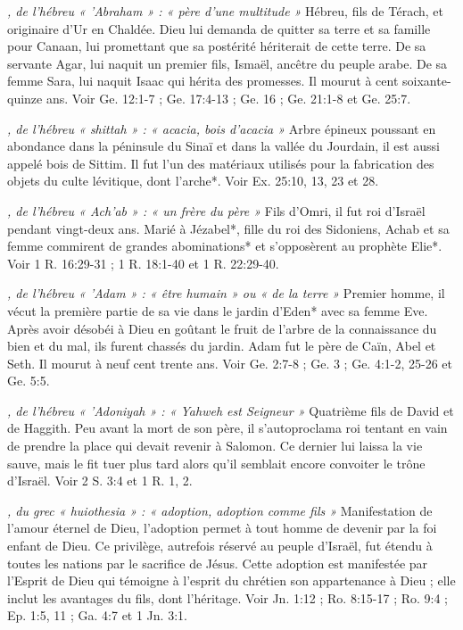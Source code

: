 \begin{multicols}{2}
{\textit{, de l'hébreu « 'Abraham » : « père d'une multitude »}\newline
Hébreu, fils de Térach, et originaire d'Ur en Chaldée. Dieu lui demanda de quitter sa terre et sa famille pour Canaan, lui promettant que sa postérité hériterait de cette terre. De sa servante Agar, lui naquit un premier fils, Ismaël, ancêtre du peuple arabe. De sa femme Sara, lui naquit Isaac qui hérita des promesses. Il mourut à cent soixante-quinze ans. Voir Ge. 12:1-7 ; Ge. 17:4-13 ; Ge. 16 ; Ge. 21:1-8 et Ge. 25:7.

\textit{, de l'hébreu « shittah » : « acacia, bois d'acacia »}\newline
Arbre épineux poussant en abondance dans la péninsule du Sinaï et dans la vallée du Jourdain, il est aussi appelé bois de Sittim. Il fut l'un des matériaux utilisés pour la fabrication des objets du culte lévitique, dont l'arche*. Voir Ex. 25:10, 13, 23 et 28.

\textit{, de l'hébreu « Ach'ab » : « un frère du père »}\newline
Fils d'Omri, il fut roi d'Israël pendant vingt-deux ans. Marié à Jézabel*, fille du roi des Sidoniens, Achab et sa femme commirent de grandes abominations* et s'opposèrent au prophète Elie*. Voir 1 R. 16:29-31 ; 1 R. 18:1-40 et 1 R. 22:29-40.

\textit{, de l'hébreu « 'Adam » : « être humain » ou « de la terre »}\newline
Premier homme, il vécut la première partie de sa vie dans le jardin d'Eden* avec sa femme Eve. Après avoir désobéi à Dieu en goûtant le fruit de l'arbre de la connaissance du bien et du mal, ils furent chassés du jardin. Adam fut le père de Caïn, Abel et Seth. Il mourut à neuf cent trente ans. Voir Ge. 2:7-8 ; Ge. 3 ; Ge. 4:1-2, 25-26 et Ge. 5:5.

\textit{, de l'hébreu « 'Adoniyah » : « Yahweh est Seigneur »}\newline
Quatrième fils de David et de Haggith. Peu avant la mort de son père, il s'autoproclama roi tentant en vain de prendre la place qui devait revenir à Salomon. Ce dernier lui laissa la vie sauve, mais le fit tuer plus tard alors qu'il semblait encore convoiter le trône d'Israël. Voir 2 S. 3:4 et 1 R. 1, 2.

\textit{, du grec « huiothesia » : « adoption, adoption comme fils »}\newline
Manifestation de l'amour éternel de Dieu, l'adoption permet à tout homme de devenir par la foi enfant de Dieu. Ce privilège, autrefois réservé au peuple d'Israël, fut étendu à toutes les nations par le sacrifice de Jésus. Cette adoption est manifestée par l'Esprit de Dieu qui témoigne à l'esprit du chrétien son appartenance à Dieu ; elle inclut les avantages du fils, dont l'héritage. Voir Jn. 1:12 ; Ro. 8:15-17 ; Ro. 9:4 ; Ep. 1:5, 11 ; Ga. 4:7 et 1 Jn. 3:1.

}
\end{multicols}
